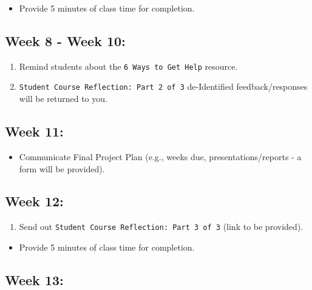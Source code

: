 \documentclass[
]{book}
\providecommand{\tightlist}{%
  \setlength{\itemsep}{0pt}\setlength{\parskip}{0pt}}
\begin{document}
\begin{itemize}
\tightlist
\item
  Provide 5 minutes of class time for completion.
\end{itemize}

\hypertarget{week-8---week-10}{%
\subsection{Week 8 - Week 10:}\label{week-8---week-10}}

\begin{enumerate}
\def\labelenumi{\arabic{enumi})}
\item
  Remind students about the \texttt{6\ Ways\ to\ Get\ Help} resource.
\item
  \texttt{Student\ Course\ Reflection:\ Part\ 2\ of\ 3} de-Identified feedback/responses will be returned to you.
\end{enumerate}

\hypertarget{week-11}{%
\subsection{Week 11:}\label{week-11}}

\begin{itemize}
\tightlist
\item
  Communicate Final Project Plan (e.g., weeks due, presentations/reports - a form will be provided).
\end{itemize}

\hypertarget{week-12}{%
\subsection{Week 12:}\label{week-12}}

\begin{enumerate}
\def\labelenumi{\arabic{enumi})}
\tightlist
\item
  Send out \texttt{Student\ Course\ Reflection:\ Part\ 3\ of\ 3} (link to be provided).
\end{enumerate}

\begin{itemize}
\tightlist
\item
  Provide 5 minutes of class time for completion.
\end{itemize}

\hypertarget{week-13}{%
\subsection{Week 13:}\label{week-13}}
\end{document}
